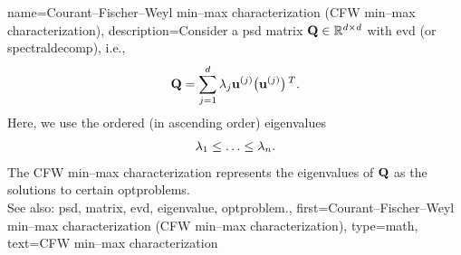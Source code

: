 {name={Courant–Fischer–Weyl min–max characterization (CFW min–max characterization)}, 
	description={Consider a \gls{psd} 
		\gls{matrix} $\mathbf{Q} \in \mathbb{R}^{d \times d}$ with 
		\gls{evd} (or \gls{spectraldecomp}), i.e.,
		$$\mathbf{Q} = \sum_{j=1}^{d} \lambda_{j} {\bf u}^{(j)} \big(  {\bf u}^{(j)}  \big)\,^{T}.$$ 
		Here, we use the ordered (in ascending order) \glspl{eigenvalue} 
		\begin{equation}
			\nonumber
		 	\lambda_{1}  \leq \ldots \leq \lambda_{n}. 
		\end{equation}
		The CFW min–max characterization \cite[Th. 8.1.2]{GolubVanLoanBook} 
		represents the \glspl{eigenvalue} of $\mathbf{Q}$ as the solutions to certain \glspl{optproblem}.
			\\
		See also: \gls{psd}, \gls{matrix}, \gls{evd}, \gls{eigenvalue}, \gls{optproblem}.}, 
	first={Courant–Fischer–Weyl min–max characterization (CFW min–max characterization)}, 
	type=math,
	text={CFW min–max characterization}
}

